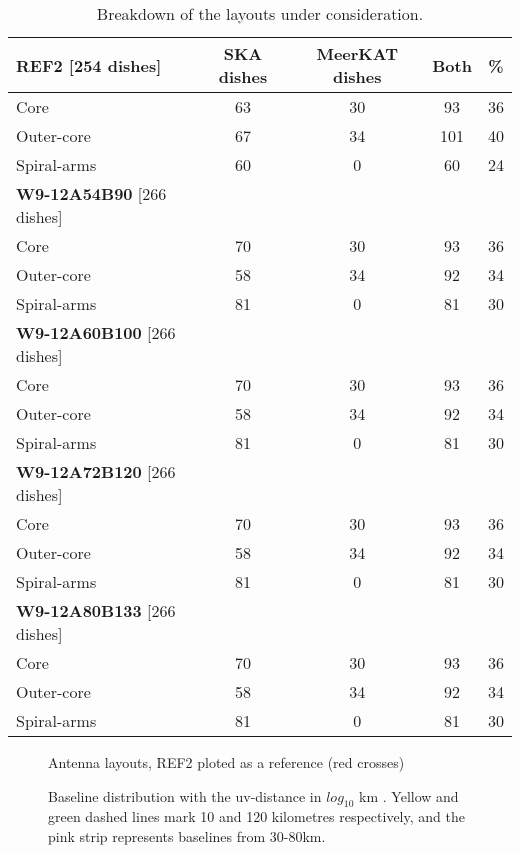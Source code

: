 \documentclass[sfheadings,a4paper,10pt,floats,floatfix]{article}
\begin{document}
\begin{table}[H]
\centering
 \tiny{
 \begin{tabular}{l|cccc}\hline
 {\bf REF2} [254 dishes] & SKA dishes&  MeerKAT dishes & Both & \% \\\hline\hline
  Core & 63 & 30 & 93 & 36 \\
 Outer-core & 67 & 34 & 101 & 40 \\
 Spiral-arms & 60 & 0 & 60 & 24 \\\hline\hline
  {\bf W9-12A54B90} [266 dishes] &  & &  & \\\hline\hline
  Core & 70 & 30 & 93 & 36 \\
 Outer-core & 58 & 34 & 92 & 34 \\
 Spiral-arms & 81 & 0 & 81 & 30 \\\hline
  {\bf W9-12A60B100} [266 dishes] &  & &  & \\\hline\hline
  Core & 70 & 30 & 93 & 36 \\
 Outer-core & 58 & 34 & 92 & 34 \\
 Spiral-arms & 81 & 0 & 81 & 30 \\\hline
  {\bf W9-12A72B120} [266 dishes] &  & &  & \\\hline\hline
  Core & 70 & 30 & 93 & 36 \\
 Outer-core & 58 & 34 & 92 & 34 \\
 Spiral-arms & 81 & 0 & 81 & 30 \\\hline
   {\bf W9-12A80B133} [266 dishes] &  & &  & \\\hline\hline
  Core & 70 & 30 & 93 & 36 \\
 Outer-core & 58 & 34 & 92 & 34 \\
 Spiral-arms & 81 & 0 & 81 & 30 \\\hline
 \end{tabular}}
 \caption{Breakdown of the layouts under consideration.}\label{tab:lay}
\end{table}

\begin{figure}[H]
 \tiny{}
 \caption{Antenna layouts, REF2 ploted as a reference (red crosses)}\label{fig:lay}
\end{figure}
\begin{figure}[H]
 \tiny{}
 \caption{Baseline distribution with the uv-distance in $log_{10}$ km . Yellow and green dashed lines mark 10 and 120
kilometres respectively, and the pink strip represents baselines from 30-80km.}\label{fig:hist}
\end{figure}
\end{document}
